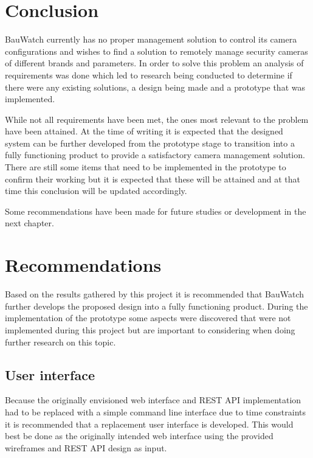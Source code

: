 \chapter{Conclusion}
BauWatch currently has no proper management solution to control its camera configurations and wishes to find a solution to remotely manage security cameras of different brands and parameters.
In order to solve this problem an analysis of requirements was done which led to research being conducted to determine if there were any existing solutions, a design being made and a prototype that was implemented.

While not all requirements have been met, the ones most relevant to the problem have been attained.
At the time of writing it is expected that the designed system can be further developed from the prototype stage to transition into a fully functioning product to provide a satisfactory camera management solution.
There are still some items that need to be implemented in the prototype to confirm their working but it is expected that these will be attained and at that time this conclusion will be updated accordingly.

Some recommendations have been made for future studies or development in the next chapter.

\chapter{Recommendations}
Based on the results gathered by this project it is recommended that BauWatch further develops the proposed design into a fully functioning product.
During the implementation of the prototype some aspects were discovered that were not implemented during this project but are important to considering when doing further research on this topic.

\section{User interface}
Because the originally envisioned web interface and REST API implementation had to be replaced with a simple command line interface due to time constraints it is recommended that a replacement user interface is developed.
This would best be done as the originally intended web interface using the provided wireframes and REST API design as input.

